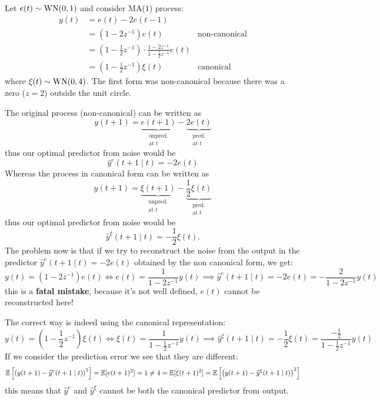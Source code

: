 \begin{example}
Let $e(t)\sim \operatorname{WN}(0,1)$ and consider MA($1$) process:
\begin{align*}
	y(t) &= e(t) - 2 e(t-1)\\
	&= (1-2z^{-1} )e(t) &\text{non-canonical}\\
	&=\left( 1-\frac{1}{2} z^{-1}  \right) \cdot\frac{1-2z^{-1}}{1-\frac{1}{2} z^{-1}} e(t)\\
	&=\left( 1-\frac{1}{2} z^{-1}  \right) \xi(t) &\text{canonical}
\end{align*}
where $\xi(t)\sim \operatorname{WN}(0,4)$. The first form was non-canonical because there was a zero ($z=2$) outside the unit circle.

The original process (non-canonical) can be written as
\[
	y(t+1)=\underbrace{e(t+1)}_{\substack{\text{unpred.}\\\text{at $t$}}}-\underbrace{2e(t)}_{\substack{\text{pred.}\\\text{at $t$}}}
\]
thus our optimal predictor from noise would be
\[
	\hat y^{e} (t+1\mid t) = -2e(t)
\]
Whereas the process in canonical form can be written as 
\[
	y(t+1) =\underbrace{\xi(t+1)}_{\substack{\text{unpred.}\\\text{at $t$}}}-\underbrace{\frac{1}{2} \xi(t)}_{\substack{\text{pred.}\\\text{at $t$}}}
\]
thus our optimal predictor from noise would be
\[
	\hat y^{\xi} (t+1\mid t)=-\frac{1}{2} \xi(t).
\]
The problem now is that if we try to reconstruct the noise from the output in the predictor $\hat y^{e} (t+1\mid t) = -2e(t)$ obtained by the non canonical form, we get:
\[
	y(t)=(1-2z^{-1})e(t) \iff e(t) =\frac{1}{1-2z^{-1}} y(t) \implies \hat y^{e} (t+1\mid t) = -2e(t) = -\frac{2}{1-2z^{-1}}y(t)
\]
this is a \textbf{fatal mistake}, because it's not well defined, $e(t)$ cannot be reconstructed here!

The correct way is indeed using the canonical representation:
\[
	y(t) = \left( 1-\frac{1}{2} z^{-1}  \right) \xi(t) \iff \xi(t) = \frac{1}{1-\frac{1}{2} z^{-1} } y(t) \implies \boxed{\hat y^{\xi} (t+1\mid t)= -\frac{1}{2} \xi(t) = \frac{-\frac{1}{2} }{1-\frac{1}{2} z^{-1} } y(t)}
\]
If we consider the prediction error we see that they are different:
\[
	\mathbb{E}\left[ \left( y(t+1)-\widehat y^{e}(t+1\mid t)  \right) ^2   \right]  =\mathbb{E}[e(t+1)^2 ]=1\neq 4=\mathbb{E}[\xi(t+1)^2 ]=\mathbb{E}\left[ \left( y(t+1)-\widehat y ^{\xi}(t+1\mid t)  \right)^2    \right]  
\]
this means that $\hat y^{e} $ and $\hat y^{\xi} $ cannot be both the canonical predictor from output.
\end{example}

